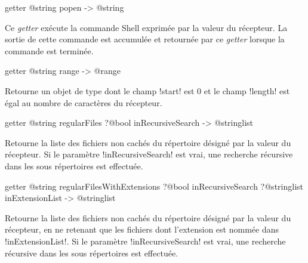 \begin{galgas4box}
getter @string popen -> @string
\end{galgas4box}

Ce \emph{getter} exécute la commande Shell exprimée par la valeur du récepteur. La sortie de cette commande est accumulée et retournée par ce \emph{getter} lorsque la commande est terminée.









\begin{galgas4box}
getter @string range -> @range
\end{galgas4box}

Retourne un objet de type  dont le champ \ggsq!start! est $0$ et le champ \ggsq!length! est égal au nombre de caractères du récepteur.









\begin{galgas4box}
getter @string regularFiles ?@bool inRecursiveSearch -> @stringlist
\end{galgas4box}

Retourne la liste des fichiers non cachés du répertoire désigné par la valeur du récepteur. Si le paramètre \ggsq!inRecursiveSearch! est vrai, une recherche récursive dans les sous répertoires est effectuée.










\begin{galgas4box}
getter @string regularFilesWithExtensions
    ?@bool inRecursiveSearch
    ?@stringlist inExtensionList -> @stringlist
\end{galgas4box}

Retourne la liste des fichiers non cachés du répertoire désigné par la valeur du récepteur, en ne retenant que les fichiers dont l'extension est nommée dans \ggsq!inExtensionList!. Si le paramètre \ggsq!inRecursiveSearch! est vrai, une recherche récursive dans les sous répertoires est effectuée.









